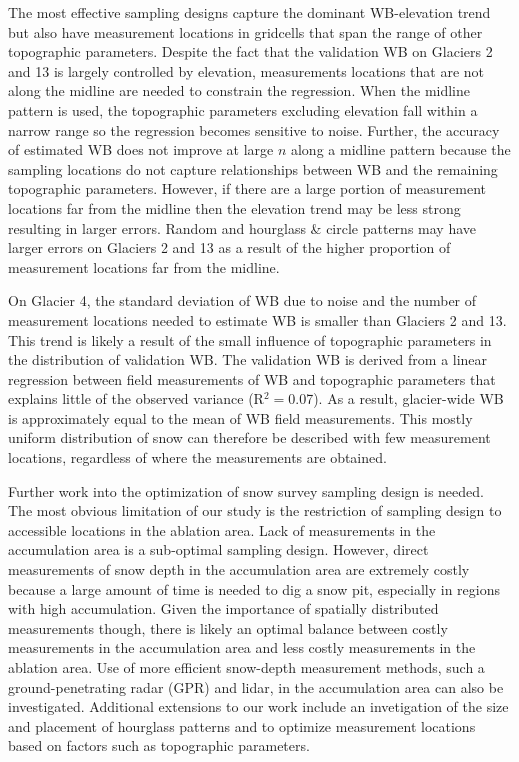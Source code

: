 \documentclass[twocolumn,letterpaper]{igs}
\begin{document}
The most effective sampling designs capture the dominant WB-elevation trend but also have measurement locations in gridcells that span the range of other topographic parameters. Despite the fact that the validation WB on Glaciers 2 and 13 is largely controlled by elevation, measurements locations that are not along the midline are needed to constrain the regression. When the midline pattern is used, the topographic parameters excluding elevation fall within a narrow range so the regression becomes sensitive to noise. Further, the accuracy of estimated WB does not improve at large $n$ along a midline pattern because the sampling locations do not capture relationships between WB and the remaining topographic parameters. However, if there are a large portion of measurement locations far from the midline then the elevation trend may be less strong resulting in larger errors. Random and hourglass \& circle patterns may have larger errors on Glaciers 2 and 13 as a result of the higher proportion of measurement locations far from the midline. 

On Glacier 4, the standard deviation of WB due to noise and the number of measurement locations needed to estimate WB is smaller than Glaciers 2 and 13. This trend is likely a result of the small influence of topographic parameters in the distribution of validation WB. The validation WB is derived from a linear regression between field measurements of WB and topographic parameters that explains little of the observed variance (R$^2=$0.07). As a result, glacier-wide WB is approximately equal to the mean of WB field measurements. This mostly uniform distribution of snow can therefore be described with few measurement locations, regardless of where the measurements are obtained. 

Further work into the optimization of snow survey sampling design is needed. The most obvious limitation of our study is the restriction of sampling design to accessible locations in the ablation area. Lack of measurements in the accumulation area is a sub-optimal sampling design. However, direct measurements of snow depth in the accumulation area are extremely costly because a large amount of time is needed to dig a snow pit, especially in regions with high accumulation. Given the importance of spatially distributed measurements though, there is likely an optimal balance between costly measurements in the accumulation area and less costly measurements in the ablation area. Use of more efficient snow-depth measurement methods, such a ground-penetrating radar (GPR) and lidar, in the accumulation area can also be investigated. Additional extensions to our work include an invetigation of the size and placement of hourglass patterns and to optimize measurement locations based on factors such as topographic parameters. 
\end{document}
